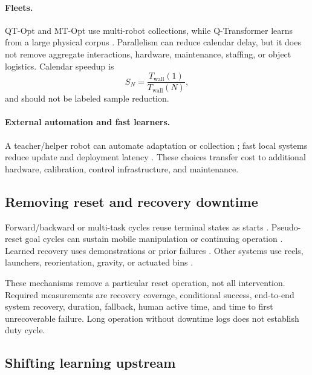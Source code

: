 \documentclass[11pt]{article}
\begin{document}
\paragraph{Fleets.}
QT-Opt and MT-Opt use multi-robot collections, while Q-Transformer learns from a large physical corpus \cite{kalashnikov2018qtopt,kalashnikov2022mtopt,chebotar2023qtransformer}. Parallelism can reduce calendar delay, but it does not remove aggregate interactions, hardware, maintenance, staffing, or object logistics. Calendar speedup is
\begin{equation}
S_N=\frac{T_{\mathrm{wall}}(1)}{T_{\mathrm{wall}}(N)},
\end{equation}
and should not be labeled sample reduction.

\paragraph{External automation and fast learners.}
A teacher/helper robot can automate adaptation or collection \cite{hu2025robottrainsrobot,mendonca2025continuous}; fast local systems reduce update and deployment latency \cite{stachowicz2023fastrlap,luo2024serl,wurss2023locality}. These choices transfer cost to additional hardware, calibration, control infrastructure, and maintenance.

\subsection{Removing reset and recovery downtime}

Forward/backward or multi-task cycles reuse terminal states as starts \cite{luo2024serl,gupta2021resetfreemtl,sharma2023medalpp}. Pseudo-reset goal cycles can sustain mobile manipulation or continuing operation \cite{sun2022relmm,mendonca2025continuous}. Learned recovery uses demonstrations or prior failures \cite{liu2026autoserl,hu2023reboot,kumar2023ptr}. Other systems use reels, launchers, reorientation, gravity, or actuated bins \cite{stachowicz2023fastrlap,wurss2023locality,lancaster2024modemv2,tebbe2021tabletennis,kalashnikov2022mtopt}.

These mechanisms remove a particular reset operation, not all intervention. Required measurements are recovery coverage, conditional success, end-to-end system recovery, duration, fallback, human active time, and time to first unrecoverable failure. Long operation without downtime logs does not establish duty cycle.

\subsection{Shifting learning upstream}
\end{document}
